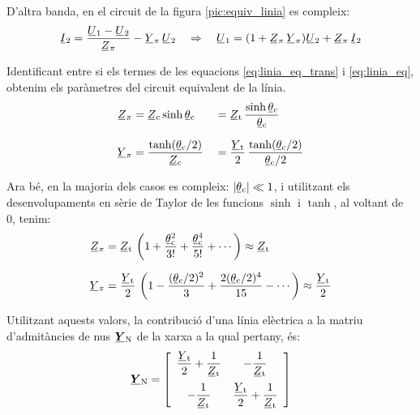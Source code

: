 D'altra banda, en el circuit de la figura \vref{pic:equiv_linia} es compleix:
\begin{equation}\label{eq:linia_eq}
   \cmplx{I}_2 = \frac{\cmplx{U}_1 - \cmplx{U}_2}{\cmplx{Z}_\pi} - \cmplx{Y}_\pi\, \cmplx{U}_2
   \quad \Rightarrow\quad
   \cmplx{U}_1 = (1 + \cmplx{Z}_\pi\,\cmplx{Y}_\pi ) \cmplx{U}_2 + \cmplx{Z}_\pi\,\cmplx{I}_2
\end{equation}

Identificant entre si els termes de les equacions
\eqref{eq:linia_eq_trans} i \eqref{eq:linia_eq}, obtenim els
paràmetres del circuit equivalent de la línia.
\begin{alignat}{2}
   \cmplx{Z}_\pi &= \cmplx{Z}\ped{c} \sinh \cmplx{\theta}\ped{c} &&= \cmplx{Z}\ped{t} \,
   \frac{\sinh \cmplx{\theta}\ped{c}}{\cmplx{\theta}\ped{c}} \\[1.5ex]
   \cmplx{Y}_\pi &= \frac{\tanh (\cmplx{\theta}\ped{c} / 2) }{\cmplx{Z}\ped{c}} &&=
   \frac{\cmplx{Y}\ped{t}}{2} \, \frac{\tanh (\cmplx{\theta}\ped{c} / 2)}{\cmplx{\theta}\ped{c} / 2}
\end{alignat}

Ara bé, en la majoria dels casos es compleix: $|\cmplx{\theta}\ped{c}| \ll 1$, i utilitzant els desenvolupaments en sèrie de Taylor de les funcions $\sinh$ i $\tanh$, al voltant de 0, tenim:
\begin{align}
   \cmplx{Z}_\pi &= \cmplx{Z}\ped{t} \, \left( 1 + \frac{\cmplx{\theta}\ped{c}^2}{3!} +
   \frac{\cmplx{\theta}\ped{c}^4}{5!} + \cdots \right) \approx \cmplx{Z}\ped{t} \\[1.5ex]
   \cmplx{Y}_\pi &= \frac{\cmplx{Y}\ped{t}}{2} \,\left( 1 - \frac{(\cmplx{\theta}\ped{c}/2)^2}{3} + \frac{2 (\cmplx{\theta}\ped{c}/2)^4}{15} - \cdots \right) \approx \frac{\cmplx{Y}\ped{t}}{2}
\end{align}

Utilitzant aquests valors, la contribució d'una línia elèctrica a
la matriu d'admitàncies de nus $\mcmplx{Y}\ped{N}$ de la xarxa a la
qual pertany, és: 
\begin{equation}
   \mcmplx{Y}\ped{N} = 
   \begin{bmatrix}\begin{array}{cc}
     \dfrac{\cmplx{Y}\ped{t}}{2} + \dfrac{1}{\cmplx{Z}\ped{t}} & -\dfrac{1}{\cmplx{Z}\ped{t}}\\[2.5ex]
     -\dfrac{1}{\cmplx{Z}\ped{t}} & \dfrac{\cmplx{Y}\ped{t}}{2} + \dfrac{1}{\cmplx{Z}\ped{t}}
    \end{array}\end{bmatrix}
\end{equation}

